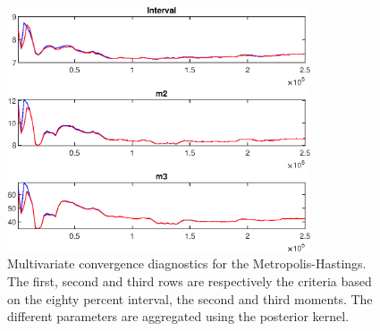  
\begin{figure}[H]
\centering 
\includegraphics[width=0.8\textwidth]{directed_search_est/Output/directed_search_est_mdiag}
\caption{Multivariate convergence diagnostics for the Metropolis-Hastings.
The first, second and third rows are respectively the criteria based on
the eighty percent interval, the second and third moments. The different 
parameters are aggregated using the posterior kernel.}\label{Fig:MultivariateDiagnostics}
\end{figure}

